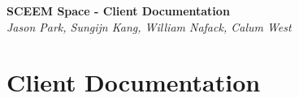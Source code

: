 \documentclass[11pt,a4paper]{article}
\begin{document}
\begin{titlepage}
   \begin{center}
      \Large\textbf{SCEEM Space - Client Documentation}\\
      \large\textit{Jason Park, Sungijn Kang, William Nafack, Calum West}
   \end{center}
\end{titlepage}

\section{Client Documentation}
\end{document}
